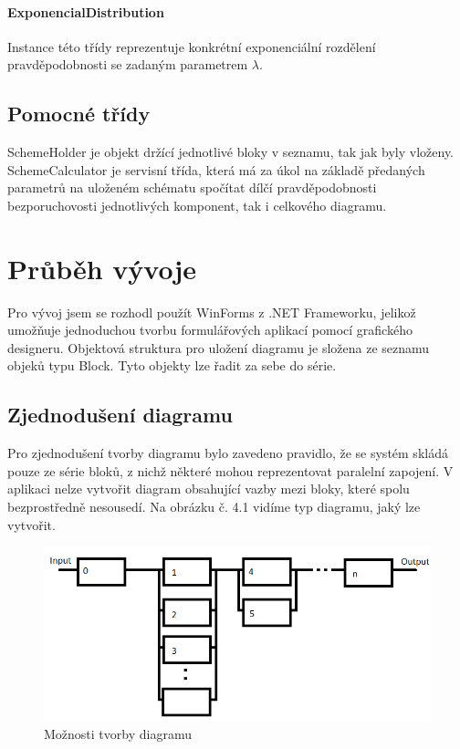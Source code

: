 \documentclass[FM,RP]{tulthesis}
\begin{document}
        \subsubsection*{ExponencialDistribution}
            Instance této třídy reprezentuje konkrétní exponenciální rozdělení pravděpodobnosti se zadaným parametrem $ \lambda $. 


    
    \section*{Pomocné třídy}
        SchemeHolder je objekt držící jednotlivé bloky v seznamu, tak jak byly vloženy. 
        SchemeCalculator je servisní třída, která má za úkol na základě předaných parametrů na uloženém schématu spočítat dílčí pravděpodobnosti bezporuchovosti jednotlivých komponent,
         tak i celkového diagramu.

\chapter{Průběh vývoje}
    Pro vývoj jsem se rozhodl použít WinForms z .NET Frameworku, jelikož umožňuje jednoduchou tvorbu formulářových aplikací pomocí grafického designeru.
    Objektová struktura pro uložení diagramu je složena ze seznamu objeků typu Block. Tyto objekty lze řadit za sebe do série.

    \section*{Zjednodušení diagramu}
        Pro zjednodušení tvorby diagramu bylo zavedeno pravidlo, že se systém skládá pouze ze série bloků, z nichž některé mohou reprezentovat paralelní zapojení.
        V aplikaci nelze vytvořit diagram obsahující vazby mezi bloky, které spolu bezprostředně nesousedí. Na obrázku č. 4.1 vidíme typ diagramu, jaký lze vytvořit.
        \begin{figure}[h]
          \centering
           \includegraphics[scale=0.55]{pic/moznosti.png}
           \caption{Možnosti tvorby diagramu} 
        \end{figure}
\end{document}
